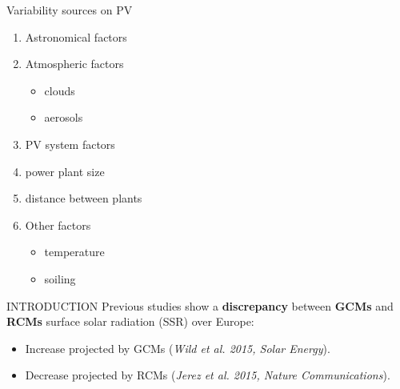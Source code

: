 \documentclass{beamer}%
\begin{document}
\begin{frame}[plain]{Variability sources on PV}
  \begin{enumerate}
  \item Astronomical factors  
  \item Atmospheric factors
    \begin{itemize}
    \item clouds
    \item aerosols
    \end{itemize}    
  \item PV system factors
  \item  power plant size
    \item distance between plants
    \item Other factors
      \begin{itemize}
      \item temperature
      \item soiling
      \end{itemize}
    \end{enumerate}   
\end{frame}

\begin{frame}[fragile]{INTRODUCTION}
\Large{}
\vspace{1\baselineskip}
\small{Previous studies show a \textbf{discrepancy} between \textbf{GCMs} and \textbf{RCMs} surface solar radiation (SSR) over Europe:\\}
\begin{itemize}
     \item \alert{Increase} projected by GCMs {\tiny(\textit{Wild et al. 2015, Solar Energy})}.
     \item \alert{Decrease} projected by RCMs {\tiny(\textit{Jerez et al. 2015, Nature Communications})}.
     \end{itemize}
\end{frame}
\end{document}
